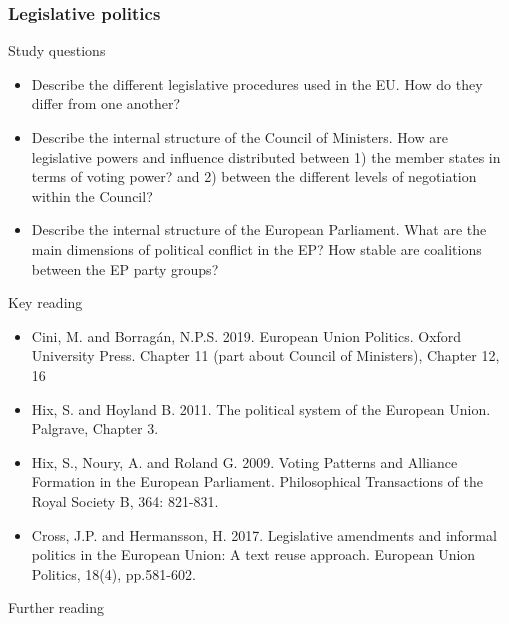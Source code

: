 \subsubsection*{Legislative politics}

Study questions

\begin{itemize}
	\item Describe the different legislative procedures used in the EU. How do they differ from one another? 
	\item Describe the internal structure of the Council of Ministers. How are legislative powers and influence distributed between 1) the member states in terms of voting power? and 2) between the different levels of negotiation within the Council?
	\item Describe the internal structure of the European Parliament. What are the main dimensions of political conflict in the EP? How stable are coalitions between the EP party groups?
\end{itemize}

\noindent Key reading

\begin{itemize}
	\item Cini, M. and Borragán, N.P.S. 2019. European Union Politics. Oxford University Press. Chapter 11 (part about Council of Ministers), Chapter 12, 16
	\item Hix, S. and	Hoyland B. 2011. The political system of the European Union. Palgrave, Chapter 3. 
	\item Hix, S., Noury, A. and Roland G. 2009. Voting Patterns and Alliance Formation in the European Parliament. Philosophical Transactions of the Royal Society B, 364: 821-831.
	\item Cross, J.P. and Hermansson, H. 2017. Legislative amendments and informal politics in the European Union: A text reuse approach. European Union Politics, 18(4), pp.581-602.
\end{itemize}

\noindent Further reading

